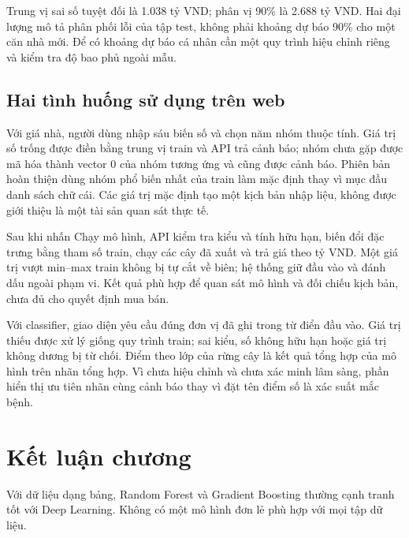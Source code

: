 Trung vị sai số tuyệt đối là 1.038 tỷ VND; phân vị 90\% là 2.688 tỷ VND.
Hai đại lượng mô tả phân phối lỗi của tập test, không phải khoảng dự báo
90\% cho một căn nhà mới. Để có khoảng dự báo cá nhân cần một quy trình
hiệu chỉnh riêng và kiểm tra độ bao phủ ngoài mẫu.

\subsection{Hai tình huống sử dụng trên web}\label{hai-tuxecnh-huux1ed1ng-sux1eed-dux1ee5ng-truxean-web}

Với giá nhà, người dùng nhập sáu biến số và chọn năm nhóm thuộc tính.
Giá trị số trống được điền bằng trung vị train và API trả cảnh báo; nhóm
chưa gặp được mã hóa thành vector 0 của nhóm tương ứng và cũng được cảnh
báo. Phiên bản hoàn thiện dùng nhóm phổ biến nhất của train làm mặc định
thay vì mục đầu danh sách chữ cái. Các giá trị mặc định tạo một kịch bản
nhập liệu, không được giới thiệu là một tài sản quan sát thực tế.

Sau khi nhấn Chạy mô hình, API kiểm tra kiểu và tính hữu hạn, biến đổi
đặc trưng bằng tham số train, chạy các cây đã xuất và trả giá theo tỷ
VND. Một giá trị vượt min--max train không bị tự cắt về biên; hệ thống
giữ đầu vào và đánh dấu ngoài phạm vi. Kết quả phù hợp để quan sát mô
hình và đối chiếu kịch bản, chưa đủ cho quyết định mua bán.


Với classifier, giao diện yêu cầu đúng đơn vị đã ghi trong từ điển đầu
vào. Giá trị thiếu được xử lý giống quy trình train; sai kiểu, số không
hữu hạn hoặc giá trị không dương bị từ chối. Điểm theo lớp của rừng cây
là kết quả tổng hợp của mô hình trên nhãn tổng hợp. Vì chưa hiệu chỉnh
và chưa xác minh lâm sàng, phần hiển thị ưu tiên nhãn cùng cảnh báo thay
vì đặt tên điểm số là xác suất mắc bệnh.


\section{Kết luận chương}\label{kux1ebft-luux1eadn-chux1b0ux1a1ng}

Với dữ liệu dạng bảng, Random Forest và Gradient Boosting thường cạnh
tranh tốt với Deep Learning. Không có một mô hình đơn lẻ phù hợp với mọi
tập dữ liệu.


